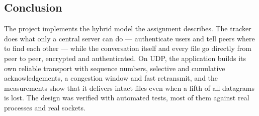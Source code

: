 \subsection{Conclusion}
The project implements the hybrid model the assignment describes. The tracker does what only a
central server can do --- authenticate users and tell peers where to find each other --- while the
conversation itself and every file go directly from peer to peer, encrypted and authenticated. On
UDP, the application builds its own reliable transport with sequence numbers, selective and
cumulative acknowledgements, a congestion window and fast retransmit, and the measurements show that
it delivers intact files even when a fifth of all datagrams is lost. The design was verified with
\FactTests{} automated tests, most of them against real processes and real sockets.
